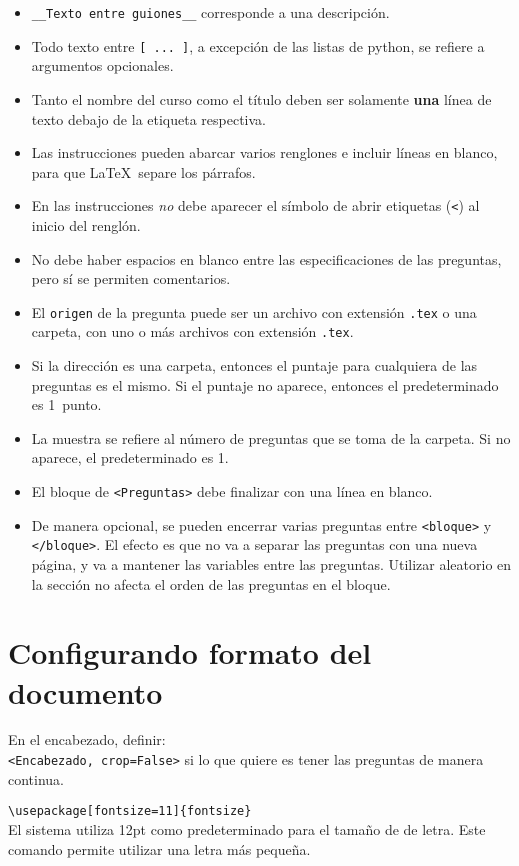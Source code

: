 \documentclass[12pt]{article}
\theoremstyle{definition}
\begin{document}
\begin{itemize}
  \item \verb|__Texto entre guiones__| corresponde a una descripción.
  \item Todo texto entre \verb|[ ... ]|, a excepción de las listas de python, se refiere a argumentos opcionales.
  \item Tanto el nombre del curso como el título deben ser solamente \textbf{una} línea de texto debajo de la etiqueta respectiva.
  \item Las instrucciones pueden abarcar varios renglones e incluir líneas en blanco, para que \LaTeX\ separe los párrafos. 
  \item En las instrucciones \emph{no} debe aparecer el símbolo de abrir etiquetas (\verb|<|) al inicio del renglón.
  \item No debe haber espacios en blanco entre las especificaciones de las preguntas, pero sí se permiten comentarios.
  \item El \verb|origen| de la pregunta puede ser un archivo con extensión \verb|.tex| o una carpeta, con uno o más archivos con extensión \verb|.tex|.
  \item Si la dirección es una carpeta, entonces el puntaje para cualquiera de las preguntas es el mismo. Si el puntaje no aparece, entonces el predeterminado es 1~punto.
  \item La muestra se refiere al número de preguntas que se toma de la carpeta. Si no aparece, el predeterminado es 1.
  \item El bloque de \verb|<Preguntas>| debe finalizar con una línea en blanco.
  \item De manera opcional, se pueden encerrar varias preguntas entre \verb|<bloque>| y \verb|</bloque>|. El efecto es que no va a separar las preguntas con una nueva página, y va a mantener las variables entre las preguntas. Utilizar aleatorio en la sección no afecta el orden de las preguntas en el bloque.
\end{itemize}

\section{Configurando formato del documento}
En el encabezado, definir: \\
\verb|<Encabezado, crop=False>|
si lo que quiere es tener las preguntas de manera continua.
\medskip

\noindent \verb|\usepackage[fontsize=11]{fontsize}| \\
El sistema utiliza 12pt como predeterminado para el tama\~no de de letra. Este comando permite utilizar una letra m\'as peque\~na.
\medskip
\end{document}

